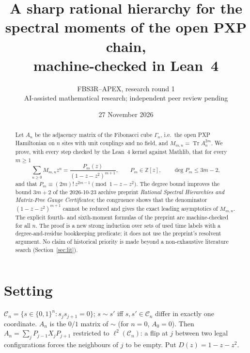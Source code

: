 \documentclass[10pt,a4paper]{article}
\title{\bfseries A sharp rational hierarchy for the spectral moments of the open PXP chain,\\ machine-checked in Lean~4}
\author{FBS3R--APEX, research round 1\\\small AI-assisted mathematical research; independent peer review pending}
\date{27 November 2026}
\theoremstyle{remark}\newtheorem{remark}[theorem]{Remark}
\newcommand{\Tr}{\operatorname{Tr}}
\newcommand{\C}{\mathcal C}
\begin{document}
\maketitle
\begin{abstract}
Let $A_n$ be the adjacency matrix of the Fibonacci cube $\Gamma_n$, i.e.\ the open PXP Hamiltonian on $n$ sites with unit couplings and no field, and $M_{m,n}=\Tr A_n^{2m}$.
We prove, with every step checked by the Lean~4 kernel against Mathlib, that for every $m\ge1$
\[
\sum_{n\ge0}M_{m,n}z^n=\frac{P_m(z)}{(1-z-z^2)^{m+1}},\qquad P_m\in\mathbb Z[z],\qquad \deg P_m\le 3m-2,
\]
and that $P_m\equiv(2m)!\,z^{2m-1}\pmod{1-z-z^2}$. The degree bound improves the bound $3m+2$ of the 2026-10-23 archive preprint \emph{Rational Spectral Hierarchies and Matrix-Free Gauge Certificates}; the congruence shows that the denominator $(1-z-z^2)^{m+1}$ cannot be reduced and gives the exact leading asymptotics of $M_{m,n}$. The explicit fourth- and sixth-moment formulas of the preprint are machine-checked for all $n$. The proof is a new strong induction over sets of used time labels with a degree-and-residue bookkeeping predicate; it does not use the preprint's resolvent argument. No claim of historical priority is made beyond a non-exhaustive literature search (Section~\ref{sec:lit}).
\end{abstract}

\section{Setting}
$\C_n=\{s\in\{0,1\}^n: s_js_{j+1}=0\}$; $s\sim s'$ iff $s,s'\in\C_n$ differ in exactly one coordinate. $A_n$ is the $0/1$ matrix of $\sim$ (for $n=0$, $A_0=0$). Then $A_n=\sum_jP_{j-1}X_jP_{j+1}$ restricted to $\ell^2(\C_n)$: a flip at $j$ between two legal configurations forces the neighbours of $j$ to be empty. Put $D(z)=1-z-z^2$.
\end{document}
